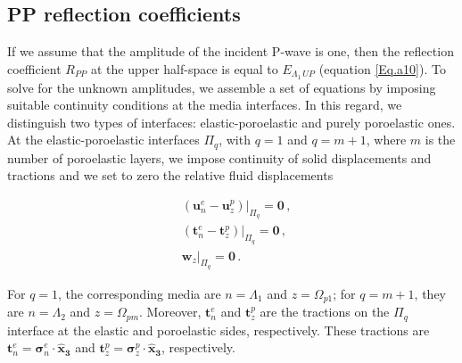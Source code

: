 \documentclass[draft]{agujournal2019}
\begin{document}
\subsection{PP reflection coefficients}
If we assume that the amplitude of the incident P-wave is one, then the reflection coefficient $R_{PP}$ at the upper half-space is equal to $E_{\Lambda_1\, UP}$ (equation \eqref{Eq.a10}). To solve for the unknown amplitudes, we assemble a set of equations by imposing suitable continuity conditions at the media interfaces.
In this regard, we distinguish two types of interfaces: elastic-poroelastic and purely poroelastic ones. At the elastic-poroelastic interfaces $\Pi_q$, with  $q=1$ and $q=m+1$, where $m$ is the number of poroelastic layers,
we impose continuity of solid displacements and tractions and we set to zero the relative fluid displacements \cite{Deresiewicz1963}
\begin{linenomath*}
\begin{equation}\label{Eq. a18}
\begin{split}
&  \left. \left(  \bm{u}_n^e -  \bm{u}_z^p \right) \right \rvert_{\Pi_q} = \bm{0} \,, \\
&  \left. \left(  \bm{t}_n^e -  \bm{t}_z^p \right) \right \rvert_{\Pi_q} = \bm{0} \,,\\
& \left.  \bm{w}_z \right \rvert_{\Pi_q} = \bm{0} \,.
\end{split}
\end{equation}
\end{linenomath*}
For $q=1$, the corresponding media are $n=\Lambda_1$ and $z=\Omega_{p1}$; for $q=m+1$, they are $n=\Lambda_2$ and $z=\Omega_{pm}$. Moreover, $ \bm{t}_n^e$ and $\bm{t}_z^p$ are the tractions on the $\Pi_q$ interface at the elastic and poroelastic sides, respectively. These tractions are $ \bm{t}_n^e =\bm{ \sigma}_n^e \cdot \bm{\hat{x}_3}$ and $ \bm{t}_z^p = \bm{\sigma}_z^p \cdot \bm{\hat{x}_3}$, respectively.
\end{document}
